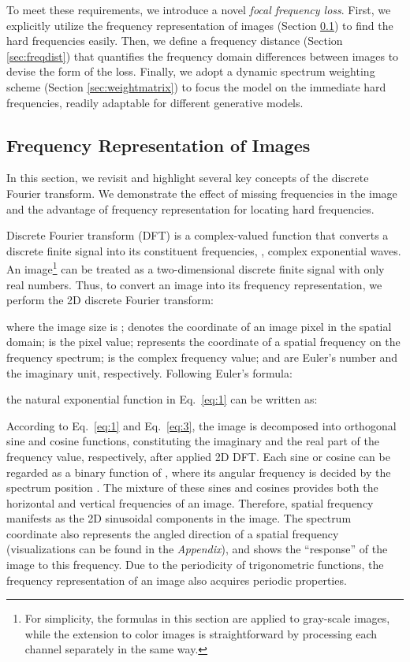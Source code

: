 \documentclass[10pt,twocolumn,letterpaper]{article}
\begin{document}
To meet these requirements, we introduce a novel \textit{focal frequency loss}.
First, we explicitly utilize the frequency representation of images (Section \ref{sec:freqrepre}) to find the hard frequencies easily.
Then, we define a frequency distance (Section \ref{sec:freqdist}) that quantifies the frequency domain differences between images to devise the form of the loss.
Finally, we adopt a dynamic spectrum weighting scheme (Section \ref{sec:weightmatrix}) to focus the model on the immediate hard frequencies, readily adaptable for different generative models.
\fi

\subsection{Frequency Representation of Images}
\label{sec:freqrepre}

In this section, we revisit and highlight several key concepts of the discrete Fourier transform. We demonstrate the effect of missing frequencies in the image and the advantage of frequency representation for locating hard frequencies.


Discrete Fourier transform (DFT) is a complex-valued function that converts a discrete finite signal into its constituent frequencies, \ie, complex exponential waves.
An image\footnote{\hspace{0.07cm}For simplicity, the formulas in this section are applied to gray-scale images, while the extension to color images is straightforward by processing each channel separately in the same way.} can be treated as a two-dimensional discrete finite signal with only real numbers. Thus, to convert an image into its frequency representation, we perform the 2D discrete Fourier transform:

where the image size is ;  denotes the coordinate of an image pixel in the spatial domain;  is the pixel value;  represents the coordinate of a spatial frequency on the frequency spectrum;   is the complex frequency value;  and  are Euler's number and the imaginary unit, respectively.
Following Euler's formula:

the natural exponential function in Eq.~\eqref{eq:1} can be written as:


According to Eq.~\eqref{eq:1} and Eq.~\eqref{eq:3}, the image is decomposed into orthogonal sine and cosine functions, constituting the imaginary and the real part of the frequency value, respectively, after applied 2D DFT.
Each sine or cosine can be regarded as a binary function of , where its angular frequency is decided by the spectrum position .
The mixture of these sines and cosines provides both the horizontal and vertical frequencies of an image.
Therefore, spatial frequency manifests as the 2D sinusoidal components in the image.
The spectrum coordinate  also represents the angled direction of a spatial frequency (visualizations can be found in the \textit{Appendix}), and  shows the ``response'' of the image to this frequency.
Due to the periodicity of trigonometric functions, the frequency representation of an image also acquires periodic properties.
\end{document}
